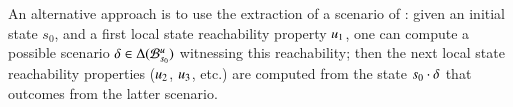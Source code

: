 An alternative approach is to use the extraction of a scenario of
:
given an initial state $s_0$, and a first local state reachability property $u_1$,
one can compute a possible scenario $\delta \in \Delta({\mathcal{B}_{s_0}^{u}})$
witnessing this reachability;
then the next local state reachability properties ($u_2$, $u_3$, etc.)
are computed from the
state $s_0 \cdot \delta$ that outcomes from the latter scenario.
